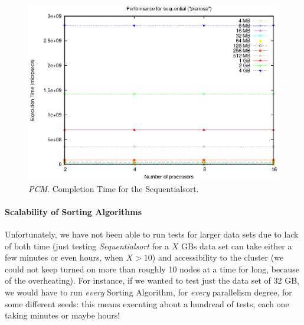 \begin{figure}[t]
	\begin{center}
		\includegraphics[scale=0.6]{plots/test_01_pianosa/NxTxM/sequential_pianosa_NxTxM}
	\end{center}
  	\caption{\textit{PCM}. Completion Time for the Sequentialsort.}
  	\label{sequential-PCM}
\end{figure}

\paragraph{Scalability of Sorting Algorithms}
Unfortunately, we have not been able to run tests for larger data sets due to lack of both time (just testing \textit{Sequentialsort} for a $X$ GBs data set can take either a few minutes or even hours, when $X > 10$) and accessibility to the cluster (we could not keep turned on more than roughly 10 nodes at a time for long, because of the overheating). For instance, if we wanted to test just the data set of 32 GB, we would have to run \textit{every} Sorting Algorithm, for \textit{every} parallelism degree, for some different seeds: this means executing about a hundread of tests, each one taking minutes or maybe hours!  

